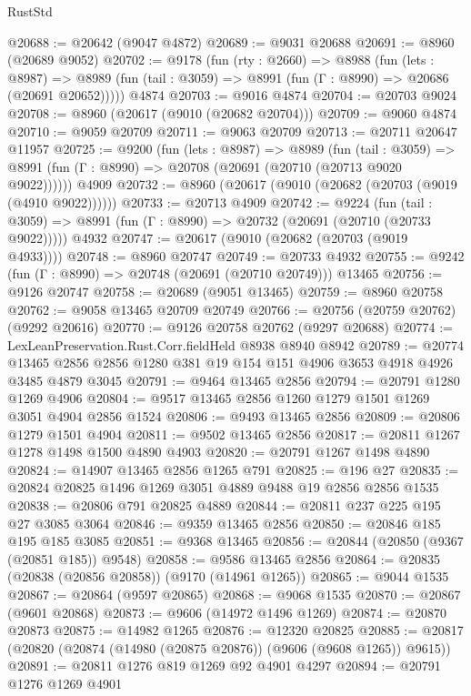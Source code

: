 \begin{lexlean}{RustStd}
\begin{coremodule}
@20688 := @20642 (@9047 @4872)
@20689 := @9031 @20688
@20691 := @8960 (@20689 @9052)
@20702 := @9178
    (fun (rty : @2660) =>
    @8988
      (fun (lets : @8987) =>
      @8989 (fun (tail : @3059) => @8991 (fun (Γ : @8990) => @20686 (@20691 @20652)))))
    @4874
@20703 := @9016 @4874
@20704 := @20703 @9024
@20708 := @8960 (@20617 (@9010 (@20682 @20704)))
@20709 := @9060 @4874
@20710 := @9059 @20709
@20711 := @9063 @20709
@20713 := @20711 @20647 @11957
@20725 := @9200
    (fun (lets : @8987) =>
    @8989
      (fun (tail : @3059) =>
      @8991 (fun (Γ : @8990) => @20708 (@20691 (@20710 (@20713 @9020 @9022))))))
    @4909
@20732 := @8960 (@20617 (@9010 (@20682 (@20703 (@9019 (@4910 @9022))))))
@20733 := @20713 @4909
@20742 := @9224
    (fun (tail : @3059) => @8991 (fun (Γ : @8990) => @20732 (@20691 (@20710 (@20733 @9022)))))
    @4932
@20747 := @20617 (@9010 (@20682 (@20703 (@9019 @4933))))
@20748 := @8960 @20747
@20749 := @20733 @4932
@20755 := @9242 (fun (Γ : @8990) => @20748 (@20691 (@20710 @20749))) @13465
@20756 := @9126 @20747
@20758 := @20689 (@9051 @13465)
@20759 := @8960 @20758
@20762 := @9058 @13465 @20709 @20749
@20766 := @20756 (@20759 @20762) (@9292 @20616)
@20770 := @9126 @20758 @20762 (@9297 @20688)
@20774 := LexLeanPreservation.Rust.Corr.fieldHeld @8938 @8940 @8942
@20789 := @20774
    @13465
    @2856
    @2856
    @1280
    @381
    @19
    @154
    @151
    @4906
    @3653
    @4918
    @4926
    @3485
    @4879
    @3045
@20791 := @9464 @13465 @2856
@20794 := @20791 @1280 @1269 @4906
@20804 := @9517 @13465 @2856 @1260 @1279 @1501 @1269 @3051 @4904 @2856 @1524
@20806 := @9493 @13465 @2856
@20809 := @20806 @1279 @1501 @4904
@20811 := @9502 @13465 @2856
@20817 := @20811 @1267 @1278 @1498 @1500 @4890 @4903
@20820 := @20791 @1267 @1498 @4890
@20824 := @14907 @13465 @2856 @1265 @791
@20825 := @196 @27
@20835 := @20824 @20825 @1496 @1269 @3051 @4889 @9488 @19 @2856 @2856 @1535
@20838 := @20806 @791 @20825 @4889
@20844 := @20811 @237 @225 @195 @27 @3085 @3064
@20846 := @9359 @13465 @2856
@20850 := @20846 @185 @195 @185 @3085
@20851 := @9368 @13465
@20856 := @20844 (@20850 (@9367 (@20851 @185)) @9548)
@20858 := @9586 @13465 @2856
@20864 := @20835 (@20838 (@20856 @20858)) (@9170 (@14961 @1265))
@20865 := @9044 @1535
@20867 := @20864 (@9597 @20865)
@20868 := @9068 @1535
@20870 := @20867 (@9601 @20868)
@20873 := @9606 (@14972 @1496 @1269)
@20874 := @20870 @20873
@20875 := @14982 @1265
@20876 := @12320 @20825
@20885 := @20817 (@20820 (@20874 (@14980 (@20875 @20876)) (@9606 (@9608 @1265)) @9615))
@20891 := @20811 @1276 @819 @1269 @92 @4901 @4297
@20894 := @20791 @1276 @1269 @4901

\end{coremodule}
\end{lexlean}
